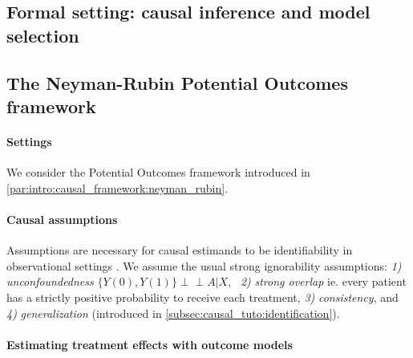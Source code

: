 \documentclass{report}
\newcommand{\indep}{\perp \!\!\! \perp}
\begin{document}
\begin{background_box_left}

  \section{Formal setting: causal inference and model selection}%
  \label{sec:causal_model_selection:setting}%

  \subsection{The Neyman-Rubin Potential Outcomes framework}%
  \label{subsec:causal_model_selection:framework}%

  \paragraph{Settings} We consider the Potential Outcomes framework introduced in
  \ref{par:intro:causal_framework:neyman_rubin}.

  \paragraph{Causal assumptions}\label{par:causal_assumptions}

  Assumptions are necessary for causal estimands to be
  identifiability
  in observational settings \citep{rubin_causal_2005}. We assume the usual
  strong ignorability assumptions: \emph{1)}
  \emph{unconfoundedness} \mbox{$\{Y(0),
      Y(1) \} \indep A | X$}, \emph{~2)} \emph{strong overlap} ie. every patient has a
  strictly positive probability to receive each treatment, \emph{3)}
  \emph{consistency}, and \emph{4)} \emph{generalization} (introduced in
  \ref{subsec:causal_tuto:identification}).

  \paragraph{Estimating treatment effects with outcome models}\label{subsec:estimators}


\end{background_box_left}
\end{document}
